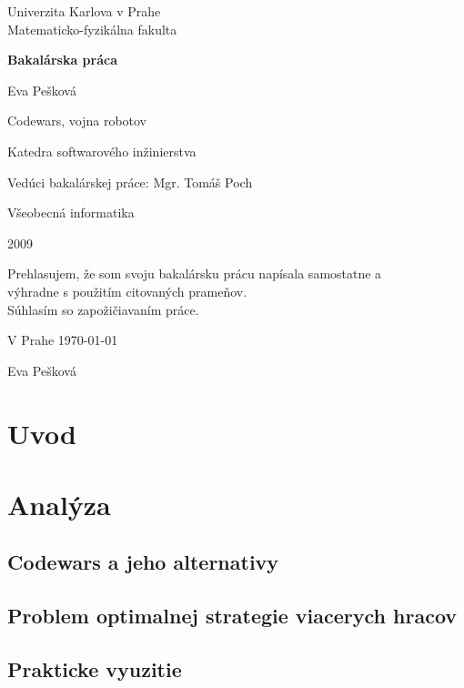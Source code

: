 \documentclass[a4paper,11pt,final]{report}
\begin{document}
\begin{titlepage}
\begin{center}
\vspace{1.5in}
{\rm Univerzita Karlova v Prahe\\
    Matematicko-fyzikálna fakulta}
\par
\vspace{0.7in}
{\huge \bf Bakalárska práca}
\par
\vspace{0.5in}
{Eva Pešková}
\par
\vspace{0.5in}
Codewars, vojna robotov
\par
\vfill
Katedra softwarového inžinierstva
\par
\vspace{0.5in}
Vedúci bakalárskej práce: Mgr. Tomáš Poch
\par
\vspace{0.5in}
Všeobecná informatika
\par
\vspace{0.5in}
2009
\end{center}
\end{titlepage}
\vfill
Prehlasujem, že som svoju bakalársku prácu napísala samostatne a \\
výhradne s použitím citovaných prameňov. \\
Súhlasím so zapožičiavaním práce.\\
\par
V Prahe \today
\begin{flushright}
Eva Pešková
\end{flushright}
\tableofcontents
\chapter{Uvod}%
\chapter{Analýza}
\section{Codewars a jeho alternativy}
\section{Problem optimalnej strategie viacerych hracov}
\section{Prakticke vyuzitie}
\end{document}
